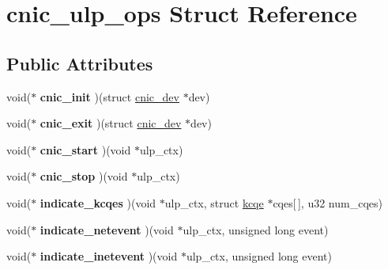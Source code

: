 \hypertarget{structcnic__ulp__ops}{
\section{cnic\_\-ulp\_\-ops Struct Reference}
\label{structcnic__ulp__ops}
}
\subsection*{Public Attributes}
\begin{DoxyCompactItemize}
\item 
\hypertarget{structcnic__ulp__ops_a67d6b5510996a4b9ee9eb91ac83f94cc}{
void($\ast$ {\bfseries cnic\_\-init} )(struct \hyperlink{structcnic__dev}{cnic\_\-dev} $\ast$dev)}
\label{structcnic__ulp__ops_a67d6b5510996a4b9ee9eb91ac83f94cc}

\item 
\hypertarget{structcnic__ulp__ops_afdd94fb001f7c11183289cc3be6e44bc}{
void($\ast$ {\bfseries cnic\_\-exit} )(struct \hyperlink{structcnic__dev}{cnic\_\-dev} $\ast$dev)}
\label{structcnic__ulp__ops_afdd94fb001f7c11183289cc3be6e44bc}

\item 
\hypertarget{structcnic__ulp__ops_acfbb6bdc7f991ba64836170aa684fff2}{
void($\ast$ {\bfseries cnic\_\-start} )(void $\ast$ulp\_\-ctx)}
\label{structcnic__ulp__ops_acfbb6bdc7f991ba64836170aa684fff2}

\item 
\hypertarget{structcnic__ulp__ops_af00b6c6d0e1dc545093a1f175408515f}{
void($\ast$ {\bfseries cnic\_\-stop} )(void $\ast$ulp\_\-ctx)}
\label{structcnic__ulp__ops_af00b6c6d0e1dc545093a1f175408515f}

\item 
\hypertarget{structcnic__ulp__ops_a65b6830cf60b352490c6eec28ce4d2ba}{
void($\ast$ {\bfseries indicate\_\-kcqes} )(void $\ast$ulp\_\-ctx, struct \hyperlink{structkcqe}{kcqe} $\ast$cqes\mbox{[}$\,$\mbox{]}, u32 num\_\-cqes)}
\label{structcnic__ulp__ops_a65b6830cf60b352490c6eec28ce4d2ba}

\item 
\hypertarget{structcnic__ulp__ops_ae260d254ede3e2c470c7b3c709812132}{
void($\ast$ {\bfseries indicate\_\-netevent} )(void $\ast$ulp\_\-ctx, unsigned long event)}
\label{structcnic__ulp__ops_ae260d254ede3e2c470c7b3c709812132}

\item 
\hypertarget{structcnic__ulp__ops_af73755205c41417c96e36cfdf491f741}{
void($\ast$ {\bfseries indicate\_\-inetevent} )(void $\ast$ulp\_\-ctx, unsigned long event)}
\label{structcnic__ulp__ops_af73755205c41417c96e36cfdf491f741}


\end{DoxyCompactItemize}
